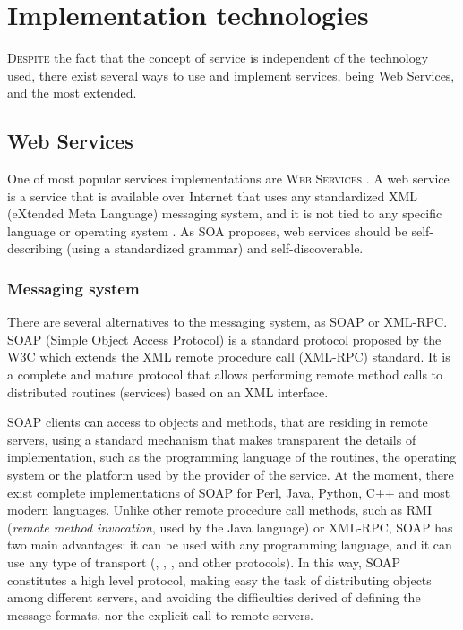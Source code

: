 \section{Implementation technologies}

\lettrine{D}{espite} the fact that the concept of service is independent of the technology used, there exist several ways to use and implement services, being Web Services,  and  the most extended.

\subsection{Web Services}

One of most popular services implementations are  \textsc{Web Services} \cite{Papazoglou2007SOA}. A web service is a service that is available over Internet that uses any standardized XML (eXtended Meta Language) \cite{XML} messaging system, and it is not tied to any specific language or operating system \cite{Cerami2002Webservices}.  As SOA proposes, web services should be self-describing (using a standardized grammar) and self-discoverable.

\subsubsection{Messaging system} There are several alternatives to the messaging system, as SOAP or XML-RPC. SOAP (Simple Object Access Protocol) is a standard protocol proposed by the W3C \cite{SOAP}  which  extends the XML remote procedure call (XML-RPC) standard. 
It is a complete and mature protocol that allows performing remote method calls to distributed routines (services) based on an XML interface.

SOAP clients can access to objects and methods, that are residing in remote servers, using a standard mechanism that makes transparent the details of implementation, such as the programming language of the
routines, the operating system or the platform used by the provider of the service. 
At the moment, there exist complete implementations of SOAP for Perl, Java, Python, C++ and most modern languages.
Unlike other remote procedure call methods, such as RMI (\emph{remote method invocation}, used by the Java language) or XML-RPC, SOAP has two main advantages: it can be used with any programming language, and it can use any type of transport (, , ,  and other protocols). In this way, SOAP constitutes a high level protocol, making easy the task of distributing objects among different servers, and avoiding the difficulties derived of defining the message formats, nor the explicit call to remote servers.


